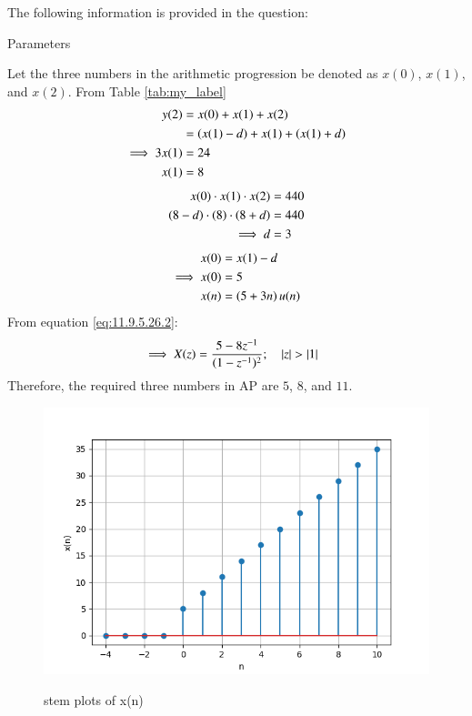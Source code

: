 \documentclass[journal,12pt,twocolumn]{IEEEtran}
\theoremstyle{remark}
\begin{document}
\solution
The following information is provided in the question:
\begin{table}[h]
 	\centering
 	\resizebox{6 cm}{!}{
 		
 	}
 	\vspace{6 pt}
 	\caption{Parameters}
 	\label{tab:my_label} 
 \end{table}
\newline
Let the three numbers in the arithmetic progression be denoted as $x(0)$, $x(1)$, and $x(2)$.
\newline
From Table \ref{tab:my_label}
\begin{align}
  y(2) &= x(0) + x(1) + x(2) \\ 
    &= \left(x(1) - d\right) + x(1) + \left(x(1) + d\right) \\
    \implies 3x(1) &= 24 \\ 
    x(1) &= 8 
\end{align}
\begin{align}
   x(0) \cdot x(1) \cdot x(2) &= 440  \\
 \left(8-d\right) \cdot \left(8\right) \cdot \left(8+d\right) &= 440  \\
  \implies d &= 3 
\end{align}
\begin{align}
     x(0) &= x(1) - d \\
     \implies x(0) &= 5  \\
     x(n) &= \left(5 + 3n\right)u(n)  
 \end{align}
 From equation \eqref{eq:11.9.5.26.2}:  
\begin{align}      
  &\implies  X(z) = \frac{5 - 8z^{-1}}{(1-z^{-1})^2} ; \quad \left\vert z\right\vert > \left\vert1\right\vert  
\end{align}
Therefore, the required three numbers in AP are $5$, $8$, and $11$.
\begin{figure}[h!]
  \centering
  \includegraphics[width=\columnwidth]{figs/stem_plot.png} 
  \label{fig:1}
  \caption{stem plots of x(n)}
\end{figure}
\end{document}
